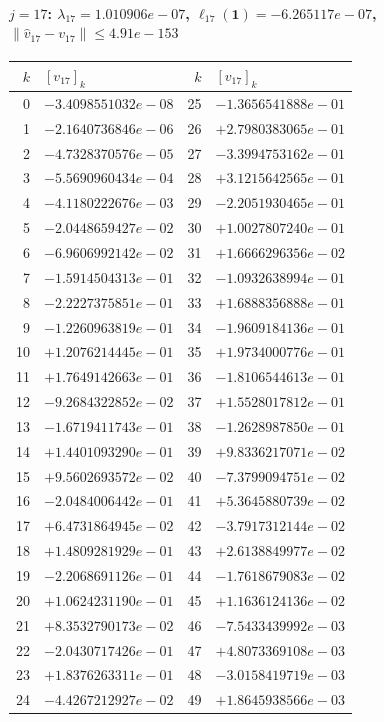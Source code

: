\documentclass[11pt]{article}
\begin{document}
\paragraph{$j = 17$: $\lambda_{17} = 1.010906e-07$, \quad $\ell_{17}(\mathbf{1}) = -6.265117e-07$, \quad $\|\hat v_{17} - v_{17}\| \leq 4.91e-153$}
\begin{center}
{\footnotesize
\begin{tabular}{r@{\;\;}l@{\quad}r@{\;\;}l}
\toprule
$k$ & $[v_{17}]_k$ & $k$ & $[v_{17}]_k$ \\
\midrule
0 & $-3.4098551032e-08$ & 25 & $-1.3656541888e-01$ \\
1 & $-2.1640736846e-06$ & 26 & $+2.7980383065e-01$ \\
2 & $-4.7328370576e-05$ & 27 & $-3.3994753162e-01$ \\
3 & $-5.5690960434e-04$ & 28 & $+3.1215642565e-01$ \\
4 & $-4.1180222676e-03$ & 29 & $-2.2051930465e-01$ \\
5 & $-2.0448659427e-02$ & 30 & $+1.0027807240e-01$ \\
6 & $-6.9606992142e-02$ & 31 & $+1.6666296356e-02$ \\
7 & $-1.5914504313e-01$ & 32 & $-1.0932638994e-01$ \\
8 & $-2.2227375851e-01$ & 33 & $+1.6888356888e-01$ \\
9 & $-1.2260963819e-01$ & 34 & $-1.9609184136e-01$ \\
10 & $+1.2076214445e-01$ & 35 & $+1.9734000776e-01$ \\
11 & $+1.7649142663e-01$ & 36 & $-1.8106544613e-01$ \\
12 & $-9.2684322852e-02$ & 37 & $+1.5528017812e-01$ \\
13 & $-1.6719411743e-01$ & 38 & $-1.2628987850e-01$ \\
14 & $+1.4401093290e-01$ & 39 & $+9.8336217071e-02$ \\
15 & $+9.5602693572e-02$ & 40 & $-7.3799094751e-02$ \\
16 & $-2.0484006442e-01$ & 41 & $+5.3645880739e-02$ \\
17 & $+6.4731864945e-02$ & 42 & $-3.7917312144e-02$ \\
18 & $+1.4809281929e-01$ & 43 & $+2.6138849977e-02$ \\
19 & $-2.2068691126e-01$ & 44 & $-1.7618679083e-02$ \\
20 & $+1.0624231190e-01$ & 45 & $+1.1636124136e-02$ \\
21 & $+8.3532790173e-02$ & 46 & $-7.5433439992e-03$ \\
22 & $-2.0430717426e-01$ & 47 & $+4.8073369108e-03$ \\
23 & $+1.8376263311e-01$ & 48 & $-3.0158419719e-03$ \\
24 & $-4.4267212927e-02$ & 49 & $+1.8645938566e-03$ \\
\bottomrule
\end{tabular}
}
\end{center}
\end{document}
